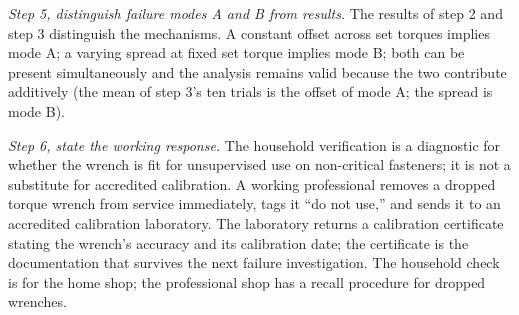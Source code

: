 \begin{exercise}
\textit{Step 5, distinguish failure modes A and B from results.} The
results of step 2 and step 3 distinguish the mechanisms. A constant
offset across set torques implies mode A; a varying spread at fixed
set torque implies mode B; both can be present simultaneously and the
analysis remains valid because the two contribute additively (the
mean of step 3's ten trials is the offset of mode A; the spread is
mode B).

\textit{Step 6, state the working response.} The household
verification is a diagnostic for whether the wrench is fit for
unsupervised use on non-critical fasteners; it is not a substitute
for accredited calibration. A working professional removes a dropped
torque wrench from service immediately, tags it ``do not use,'' and
sends it to an accredited calibration laboratory. The laboratory
returns a calibration certificate stating the wrench's accuracy and
its calibration date; the certificate is the documentation that
survives the next failure investigation. The household check is for
the home shop; the professional shop has a recall procedure for
dropped wrenches.
\end{exercise}

